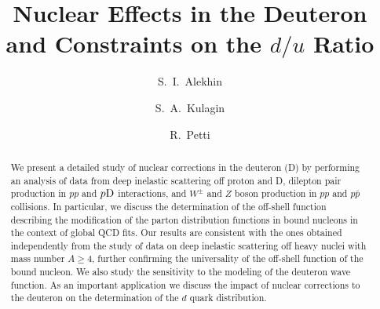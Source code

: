 \documentclass[%
      aps,
      prd,
      floatfix,
      preprintnumbers,
      preprint,
      showpacs,
      nofootinbib,
      tightenlines,
      amssymb,
      amsmath
]{revtex4-1}
\begin{document}
\title{%
Nuclear Effects in the Deuteron and Constraints on the $d/u$ Ratio  
}

\author{S.~I.~Alekhin}
%
\author{S.~A.~Kulagin}
%
\author{R.~Petti}


\begin{abstract}
We present a detailed study of nuclear corrections in the deuteron (D) by performing an analysis of 
data from deep inelastic scattering off proton and D, dilepton pair production in $pp$ and $p{\rm D}$ 
interactions, and $W^\pm$ and $Z$ boson production in $pp$ and $p \bar p$ collisions. 
In particular, we discuss the determination of the off-shell function describing the modification 
of the parton distribution functions in bound nucleons in the context of global QCD fits. 
Our results are consistent with the ones obtained independently from the study of data on deep 
inelastic scattering off heavy nuclei with mass number $A\geq4$, further confirming the universality 
of the off-shell function of the bound nucleon. 
We also study the sensitivity to the modeling of the deuteron wave function. 
As an important application we discuss the impact of nuclear corrections to the deuteron 
on the determination of the $d$ quark distribution.

\end{abstract}


\maketitle
\end{document}

